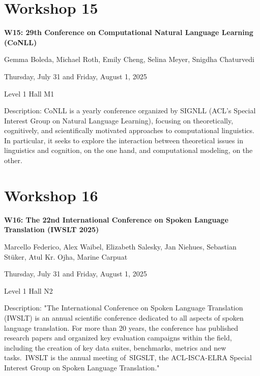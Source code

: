 \clearpage


\section[W15: 29th Conference on Computational Natural Language Learning (CoNLL)]{Workshop 15}

\begin{center}
    {\Large \textbf{W15: 29th Conference on Computational Natural Language Learning (CoNLL)}}

    Gemma Boleda, Michael Roth, Emily Cheng, Selina Meyer, Snigdha Chaturvedi
    
    Thursday, July 31 and Friday, August 1, 2025
    
    Level 1 Hall M1

\end{center}

Description: CoNLL is a yearly conference organized by SIGNLL (ACL's Special Interest Group on Natural Language Learning), focusing on theoretically, cognitively, and scientifically motivated approaches to computational linguistics.  In particular, it seeks to explore the interaction between theoretical issues in linguistics and cognition, on the one hand, and computational modeling, on the other.

\clearpage



\section[W16: The 22nd International Conference on Spoken Language Translation (IWSLT 2025)]{Workshop 16}

\begin{center}
    {\Large \textbf{W16: The 22nd International Conference on Spoken Language Translation (IWSLT 2025)}}

   Marcello Federico, Alex Waibel, Elizabeth Salesky, Jan Niehues, Sebastian Stüker, Atul Kr. Ojha, Marine Carpuat
    
    Thursday, July 31 and Friday, August 1, 2025
    
    Level 1 Hall N2

\end{center}

Description: "The International Conference on Spoken Language Translation (IWSLT) is an annual scientific conference dedicated to all aspects of spoken language translation. For more than 20 years, the conference has published research papers and organized key evaluation campaigns within the field, including the creation of key data suites, benchmarks, metrics and new tasks. IWSLT is the annual meeting of SIGSLT, the ACL-ISCA-ELRA Special Interest Group on Spoken Language Translation."

